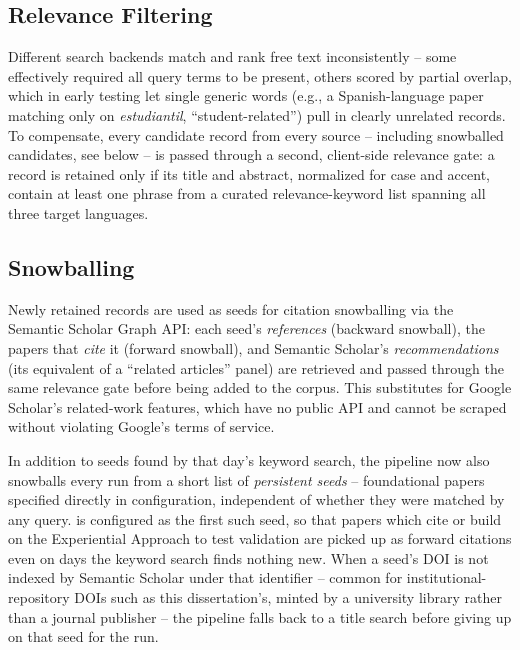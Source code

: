 \documentclass[11pt]{article}
\begin{document}
\subsection{Relevance Filtering}
\label{sec:relevance}

Different search backends match and rank free text inconsistently -- some effectively required all query terms to be present, others scored by partial overlap, which in early testing let single generic words (e.g., a Spanish-language paper matching only on \textit{estudiantil}, ``student-related'') pull in clearly unrelated records. To compensate, every candidate record from every source -- including snowballed candidates, see below -- is passed through a second, client-side relevance gate: a record is retained only if its title and abstract, normalized for case and accent, contain at least one phrase from a curated relevance-keyword list spanning all three target languages.

\subsection{Snowballing}
\label{sec:snowball_persistent}

Newly retained records are used as seeds for citation snowballing via the Semantic Scholar Graph API: each seed's \emph{references} (backward snowball), the papers that \emph{cite} it (forward snowball), and Semantic Scholar's \emph{recommendations} (its equivalent of a ``related articles'' panel) are retrieved and passed through the same relevance gate before being added to the corpus. This substitutes for Google Scholar's related-work features, which have no public API and cannot be scraped without violating Google's terms of service.

In addition to seeds found by that day's keyword search, the pipeline now also snowballs every run from a short list of \emph{persistent seeds} -- foundational papers specified directly in configuration, independent of whether they were matched by any query. \citet{araneda2023dissertation} is configured as the first such seed, so that papers which cite or build on the Experiential Approach to test validation are picked up as forward citations even on days the keyword search finds nothing new. When a seed's DOI is not indexed by Semantic Scholar under that identifier -- common for institutional-repository DOIs such as this dissertation's, minted by a university library rather than a journal publisher -- the pipeline falls back to a title search before giving up on that seed for the run.
\end{document}
